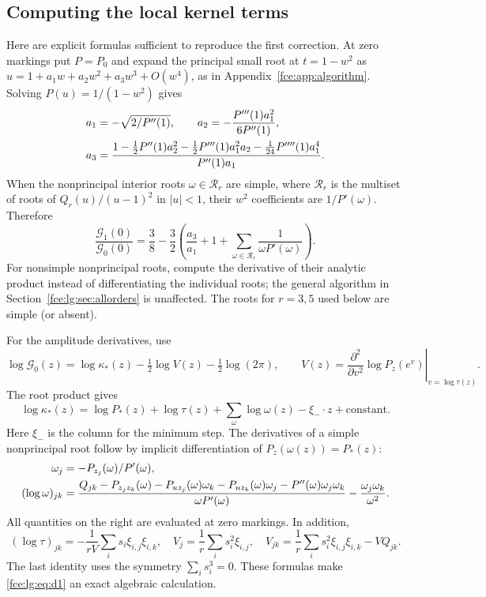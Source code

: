 \documentclass[11pt,a4paper]{article}
\numberwithin{equation}{section}
\theoremstyle{definition}\newtheorem{definition}[theorem]{Definition}
\theoremstyle{remark}\newtheorem{remark}[theorem]{Remark}
\begin{document}
\subsection{Computing the local kernel terms}
Here are explicit formulas sufficient to reproduce the first correction. At
zero markings put $P=P_0$ and expand the principal small root at $t=1-w^2$
as $u=1+a_1w+a_2w^2+a_3w^3+O(w^4)$, as in Appendix~\ref{fce:app:algorithm}.
Solving $P(u)=1/(1-w^2)$ gives
\begin{align}\label{fce:lg:eq:v123}
 a_1&=-\sqrt{2/P''(1)},\qquad
 a_2=-\frac{P'''(1)a_1^2}{6P''(1)},\notag\\
 a_3&=\frac{1-\frac12P''(1)a_2^2
                -\frac12P'''(1)a_1^2a_2
                -\frac1{24}P''''(1)a_1^4}{P''(1)a_1}.
\end{align}
When the nonprincipal interior roots $\omega\in\mathcal R_r$ are simple,
where $\mathcal R_r$ is the multiset of roots of $Q_r(u)/(u-1)^2$ in
$|u|<1$, their $w^2$ coefficients are $1/P'(\omega)$. Therefore
\begin{equation}\label{fce:lg:eq:g1ratio}
 \frac{\mathcal G_1(0)}{\mathcal G_0(0)}=\frac38-\frac32
 \left(\frac{a_3}{a_1}+1+\sum_{\omega\in\mathcal R_r}
                    \frac1{\omega P'(\omega)}\right).
\end{equation}
For nonsimple nonprincipal roots, compute the derivative of their analytic
product instead of differentiating the individual roots; the general
algorithm in Section~\ref{fce:lg:sec:allorders} is unaffected. The roots
for $r=3,5$ used below are simple (or absent).

For the amplitude derivatives, use
\[
 \log\mathcal G_0(z)=\log\kappa_*(z)-\tfrac12\log V(z)-\tfrac12\log(2\pi),
 \qquad V(z)=\left.\frac{\partial^2}{\partial v^2}
 \log P_z(e^v)\right|_{v=\log\tau(z)}.
\]
The root product gives
\[
 \log\kappa_*(z)=\log P_*(z)+\log\tau(z)
       +\sum_\omega\log\omega(z)-\xi_-\cdot z+\text{constant}.
\]
Here $\xi_-$ is the column for the minimum step. The derivatives of a
simple nonprincipal root follow by implicit differentiation of
$P_z(\omega(z))=P_*(z)$:
\begin{align}\label{fce:lg:eq:rootderivatives}
 \omega_j&=-P_{z_j}(\omega)/P'(\omega),\notag\\
 (\log\omega)_{jk}
 &=\frac{Q_{jk}-P_{z_jz_k}(\omega)
      -P_{uz_j}(\omega)\omega_k-P_{uz_k}(\omega)\omega_j
      -P''(\omega)\omega_j\omega_k}{\omega P'(\omega)}
      -\frac{\omega_j\omega_k}{\omega^2}.
\end{align}
All quantities on the right are evaluated at zero markings. In addition,
\[
 (\log\tau)_{jk}=-\frac1{rV}\sum_i s_i\xi_{i,j}\xi_{i,k},\quad
 V_j=\frac1r\sum_i s_i^2\xi_{i,j},\quad
 V_{jk}=\frac1r\sum_i s_i^2\xi_{i,j}\xi_{i,k}-VQ_{jk}.
\]
The last identity uses the symmetry $\sum_i s_i^3=0$. These formulas make
\eqref{fce:lg:eq:d1} an exact algebraic calculation.
\end{document}
